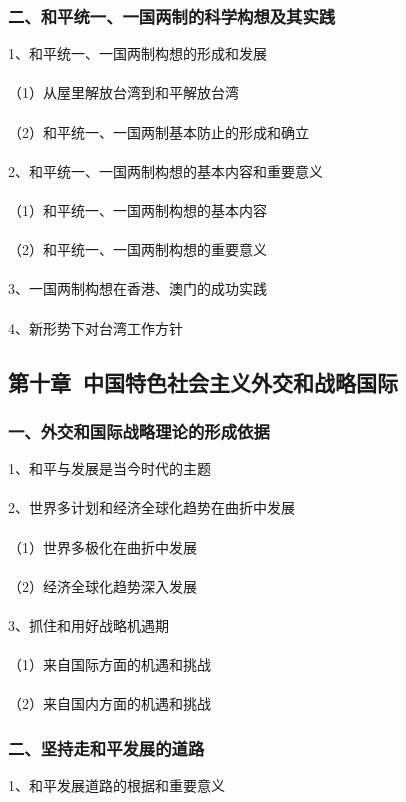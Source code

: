 \documentclass{ctexart}
\begin{document}
\subsubsection{二、和平统一、一国两制的科学构想及其实践}
1、和平统一、一国两制构想的形成和发展
\\\\
（1）从屋里解放台湾到和平解放台湾
\\\\
（2）和平统一、一国两制基本防止的形成和确立
\\\\

2、和平统一、一国两制构想的基本内容和重要意义
\\\\
（1）和平统一、一国两制构想的基本内容
\\\\
（2）和平统一、一国两制构想的重要意义
\\\\

3、一国两制构想在香港、澳门的成功实践
\\\\

4、新形势下对台湾工作方针

\subsection{第十章\ 中国特色社会主义外交和战略国际}
\subsubsection{一、外交和国际战略理论的形成依据}
1、和平与发展是当今时代的主题
\\\\

2、世界多计划和经济全球化趋势在曲折中发展
\\\\
（1）世界多极化在曲折中发展
\\\\
（2）经济全球化趋势深入发展
\\\\

3、抓住和用好战略机遇期
\\\\
（1）来自国际方面的机遇和挑战
\\\\
（2）来自国内方面的机遇和挑战
\subsubsection{二、坚持走和平发展的道路}
1、和平发展道路的根据和重要意义
\\\\
\end{document}
